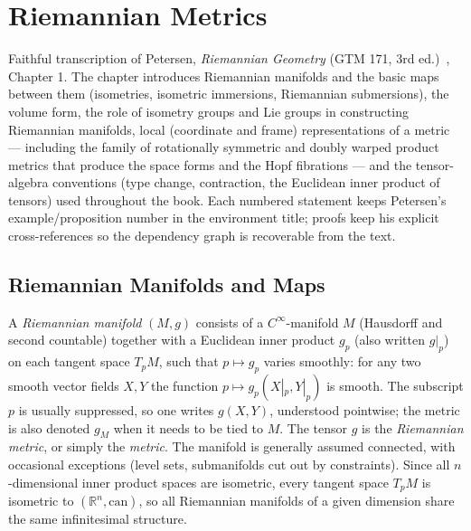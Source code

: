 \chapter{Riemannian Metrics}
\label{chap:pet-riemannian-metrics}

Faithful transcription of Petersen, \emph{Riemannian Geometry} (GTM 171, 3rd ed.)~\cite{petersen2016},
Chapter 1. The chapter introduces Riemannian manifolds and the basic maps between
them (isometries, isometric immersions, Riemannian submersions), the volume form,
the role of isometry groups and Lie groups in constructing Riemannian manifolds,
local (coordinate and frame) representations of a metric — including the family of
rotationally symmetric and doubly warped product metrics that produce the space
forms and the Hopf fibrations — and the tensor-algebra conventions (type change,
contraction, the Euclidean inner product of tensors) used throughout the book. Each
numbered statement keeps Petersen's example/proposition number in the environment
title; proofs keep his explicit cross-references so the dependency graph is
recoverable from the text.

\section{Riemannian Manifolds and Maps}

\begin{definition}
  \label{def:pet-ch1-riemannian-manifold}
  \leanok
  A \emph{Riemannian manifold} $(M,g)$ consists of a $C^\infty$-manifold $M$
  (Hausdorff and second countable) together with a Euclidean inner product $g_p$
  (also written $g|_p$) on each tangent space $T_pM$, such that $p\mapsto g_p$
  varies smoothly: for any two smooth vector fields $X,Y$ the function
  $p\mapsto g_p(X|_p,Y|_p)$ is smooth. The subscript $p$ is usually suppressed, so
  one writes $g(X,Y)$, understood pointwise; the metric is also denoted $g_M$ when
  it needs to be tied to $M$. The tensor $g$ is the \emph{Riemannian metric}, or
  simply the \emph{metric}. The manifold is generally assumed connected, with
  occasional exceptions (level sets, submanifolds cut out by constraints). Since
  all $n$-dimensional inner product spaces are isometric, every tangent space
  $T_pM$ is isometric to $(\mathbb{R}^n,\text{can})$, so all Riemannian manifolds of a
  given dimension share the same infinitesimal structure.
\end{definition}

